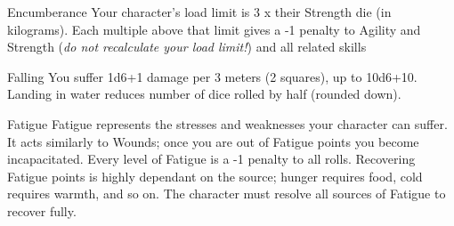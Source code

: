 \begin{genericsection}{Encumberance}
Your character's load limit is 3 x their Strength die (in kilograms). Each multiple above that limit gives a -1 penalty to Agility and Strength (\textit{do not recalculate your load limit!}) and all related skills
\end{genericsection}

\begin{genericsection}{Falling}
  You suffer 1d6+1 damage per 3 meters (2 squares), up to 10d6+10. Landing in water reduces number of dice rolled by half (rounded down).
\end{genericsection}

\begin{genericsection}{Fatigue}
Fatigue represents the stresses and weaknesses your character can suffer. It acts similarly to Wounds; once you are out of Fatigue points you become incapacitated. Every level of Fatigue is a -1 penalty to all rolls. Recovering Fatigue points is highly dependant on the source; hunger requires food, cold requires warmth, and so on. The character must resolve all sources of Fatigue to recover fully.


\end{genericsection}
